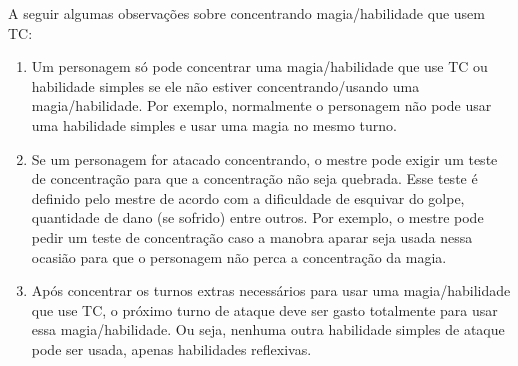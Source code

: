 A seguir algumas observações sobre concentrando magia/habilidade que usem TC:
\begin{enumerate}

	\item Um personagem só pode concentrar uma magia/habilidade que use TC ou habilidade simples se ele não estiver concentrando/usando uma magia/habilidade. Por exemplo, normalmente o personagem não pode usar uma habilidade simples e usar uma magia no mesmo turno.

	

	\item Se um personagem for atacado concentrando, o mestre pode exigir um teste de concentração para que a concentração não seja quebrada. Esse teste é definido pelo mestre de acordo com a dificuldade de esquivar do golpe, quantidade de dano (se sofrido) entre outros. Por exemplo, o mestre pode pedir um teste de concentração caso a manobra aparar seja usada nessa ocasião para que o personagem não perca a concentração da magia.

	\item Após concentrar os turnos extras necessários para usar uma magia/habilidade que use TC, o próximo turno de ataque deve ser gasto totalmente para usar essa magia/habilidade. Ou seja, nenhuma outra habilidade simples de ataque pode ser usada, apenas habilidades reflexivas.

\end{enumerate}


